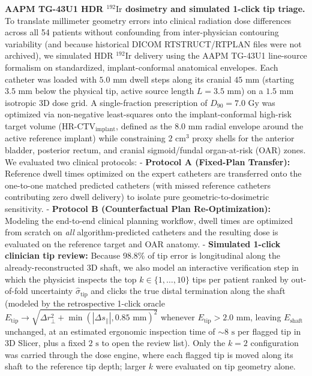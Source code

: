 \documentclass[
  11pt,
]{article}
\begin{document}
\textbf{AAPM TG-43U1 HDR \(^{192}\text{Ir}\) dosimetry and simulated
1-click tip triage.} To translate millimeter geometry errors into
clinical radiation dose differences across all 54 patients without
confounding from inter-physician contouring variability (and because
historical DICOM RTSTRUCT/RTPLAN files were not archived), we simulated
HDR \(^{192}\text{Ir}\) delivery using the AAPM TG-43U1 line-source
formalism on standardized, implant-conformal anatomical envelopes. Each
catheter was loaded with \(5.0\text{ mm}\) dwell steps along its cranial
\(45\text{ mm}\) (starting \(3.5\text{ mm}\) below the physical tip,
active source length \(L = 3.5\text{ mm}\)) on a \(1.5\text{ mm}\)
isotropic 3D dose grid. A single-fraction prescription of
\(D_{90} = 7.0\text{ Gy}\) was optimized via non-negative least-squares
onto the implant-conformal high-risk target volume
(\(\text{HR-CTV}_{\text{implant}}\), defined as the \(8.0\text{ mm}\)
radial envelope around the active reference implant) while constraining
\(2\text{ cm}^3\) proxy shells for the anterior bladder, posterior
rectum, and cranial sigmoid/fundal organ-at-risk (OAR) zones. We
evaluated two clinical protocols: - \textbf{Protocol A (Fixed-Plan
Transfer):} Reference dwell times optimized on the expert catheters are
transferred onto the one-to-one matched predicted catheters (with missed
reference catheters contributing zero dwell delivery) to isolate pure
geometric-to-dosimetric sensitivity. - \textbf{Protocol B
(Counterfactual Plan Re-Optimization):} Modeling the end-to-end clinical
planning workflow, dwell times are optimized from scratch on \emph{all}
algorithm-predicted catheters and the resulting dose is evaluated on the
reference target and OAR anatomy. - \textbf{Simulated 1-click clinician
tip review:} Because 98.8\% of tip error is longitudinal along the
already-reconstructed 3D shaft, we also model an interactive
verification step in which the physicist inspects the top
\(k \in \{1, \dots, 10\}\) tips per patient ranked by out-of-fold
uncertainty \(\hat{\sigma}_{\text{tip}}\) and clicks the true distal
termination along the shaft (modeled by the retrospective 1-click oracle
\(E_{\text{tip}} \to \sqrt{\Delta r_\perp^2 + \min(|\Delta s_\parallel|, 0.85\text{ mm})^2}\)
whenever \(E_{\text{tip}} > 2.0\text{ mm}\), leaving
\(E_{\text{shaft}}\) unchanged, at an estimated ergonomic inspection
time of \(\sim 8\text{ s}\) per flagged tip in 3D Slicer, plus a fixed
\(2\text{ s}\) to open the review list). Only the \(k = 2\)
configuration was carried through the dose engine, where each flagged
tip is moved along its shaft to the reference tip depth; larger \(k\)
were evaluated on tip geometry alone.
\end{document}
